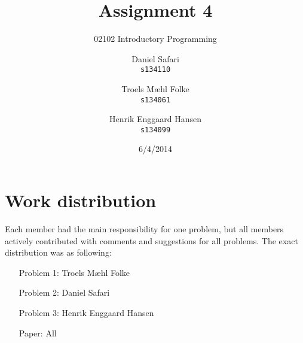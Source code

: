 \documentclass{scrartcl}
\begin{document}

\title{Assignment 4}
\subtitle{02102 Introductory Programming}
\author{
  Daniel Safari\\
  \texttt{s134110}
  \and
  Troels Mæhl Folke\\
  \texttt{s134061}
   \and
  Henrik Enggaard Hansen\\
  \texttt{s134099}
}
\date{6/4/2014}
\maketitle
\thispagestyle{empty}
\setcounter{page}{0}
\null
\vfill
\section*{Work distribution}

Each member had the main responsibility for one problem, but all members
actively contributed with comments and suggestions for all problems. 
The exact distribution was as following:
\begin{itemize}
\setlength{\itemindent}{3em}
\item[Problem 1:] Troels Mæhl Folke
\item[Problem 2:] Daniel Safari
\item[Problem 3:] Henrik Enggaard Hansen
\item[Paper:]  All
\end{itemize}
\newpage






\end{document}
